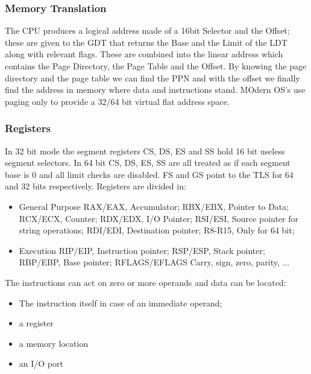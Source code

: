 \documentclass[paper=a4, fontsize=11pt]{report} %
\numberwithin{equation}{section} %
\numberwithin{figure}{section} %
\numberwithin{table}{section} %
\begin{document}
\subsubsection{Memory Translation}
The CPU produces a logical address made of a 16bit Selector and the Offset; 
these are given to the GDT that returns the Base and the Limit of the LDT along 
with relevant flags. These are combined into the linear address which contains 
the Page Directory, the Page Table and the Offset. By knowing the page 
directory and the page table we can find the PPN and with the offset we 
finally find the address in memory where data and instructions stand.
MOdern OS's use paging only to provide a 32/64 bit virtual flat address space.
\subsubsection{Registers}
In 32 bit mode the segment registers CS, DS, ES and SS hold 16 bit useless 
segment selectors. In 64 bit CS, DS, ES, SS are all treated as if each segment 
base is 0 and all limit checks are disabled. FS and GS point to the TLS for 64 
and 32 bits respectively. Registers are divided in:
\begin{itemize}
	\item General Purpose
	\subitem RAX/EAX, Accumulator;
	\subitem RBX/EBX, Pointer to Data;
	\subitem RCX/ECX, Counter;
	\subitem RDX/EDX, I/O Pointer;
	\subitem RSI/ESI, Source pointer for string operations;
	\subitem RDI/EDI, Destination pointer;
	\subitem R8-R15, Only for 64 bit;
	\item Execution
	\subitem RIP/EIP, Instruction pointer;
	\subitem RSP/ESP, Stack pointer;
	\subitem RBP/EBP, Base pointer;
	\subitem RFLAGS/EFLAGS Carry, sign, zero, parity, ...
\end{itemize}
\newpage
The instructions can act on zero or more operands and data can be located:
\begin{itemize}
	\item The instruction itself in case of an immediate operand;
	\item a register
	\item a memory location
	\item an I/O port
\end{itemize}
\glsaddall
\printglossaries
\end{document}
